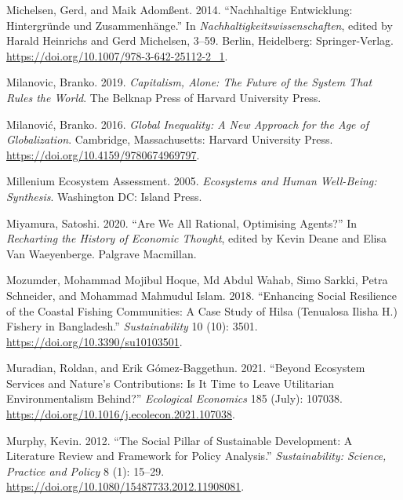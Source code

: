 \documentclass[
  a4paper,
  openany]{book}
\newlength{\cslhangindent}
\newenvironment{CSLReferences}[2] %
 {\begin{list}{}{%
  \setlength{\itemindent}{0pt}
  \setlength{\leftmargin}{0pt}
  \setlength{\parsep}{0pt}
  \ifodd #1
   \setlength{\leftmargin}{\cslhangindent}
   \setlength{\itemindent}{-1\cslhangindent}
  \fi
  \setlength{\itemsep}{#2\baselineskip}}}
 {\end{list}}
\begin{document}
\begin{CSLReferences}{1}{0}
Michelsen, Gerd, and Maik Adomßent. 2014. {``{Nachhaltige Entwicklung:
Hintergr{ü}nde und Zusammenh{ä}nge}.''} In
\emph{{Nachhaltigkeitswissenschaften}}, edited by Harald Heinrichs and
Gerd Michelsen, 3--59. Berlin, Heidelberg: Springer-Verlag.
\url{https://doi.org/10.1007/978-3-642-25112-2_1}.

Milanovic, Branko. 2019. \emph{Capitalism, {Alone}: {The Future} of the
{System} That {Rules} the {World}}. The Belknap Press of Harvard
University Press.

Milanović, Branko. 2016. \emph{Global {Inequality}: {A New Approach} for
the {Age} of {Globalization}}. Cambridge, Massachusetts: Harvard
University Press. \url{https://doi.org/10.4159/9780674969797}.

Millenium Ecosystem Assessment. 2005. \emph{Ecosystems and {Human
Well-Being}: {Synthesis}}. Washington DC: Island Press.

Miyamura, Satoshi. 2020. {``Are {We All Rational}, {Optimising
Agents}?''} In \emph{Recharting the {History} of {Economic Thought}},
edited by Kevin Deane and Elisa Van Waeyenberge. Palgrave Macmillan.

Mozumder, Mohammad Mojibul Hoque, Md Abdul Wahab, Simo Sarkki, Petra
Schneider, and Mohammad Mahmudul Islam. 2018. {``Enhancing {Social
Resilience} of the {Coastal Fishing Communities}: {A Case Study} of
{Hilsa} ({Tenualosa Ilisha H}.) {Fishery} in {Bangladesh}.''}
\emph{Sustainability} 10 (10): 3501.
\url{https://doi.org/10.3390/su10103501}.

Muradian, Roldan, and Erik Gómez-Baggethun. 2021. {``Beyond Ecosystem
Services and Nature's Contributions: {Is} It Time to Leave Utilitarian
Environmentalism Behind?''} \emph{Ecological Economics} 185 (July):
107038. \url{https://doi.org/10.1016/j.ecolecon.2021.107038}.

Murphy, Kevin. 2012. {``The Social Pillar of Sustainable Development: A
Literature Review and Framework for Policy Analysis.''}
\emph{Sustainability: Science, Practice and Policy} 8 (1): 15--29.
\url{https://doi.org/10.1080/15487733.2012.11908081}.


\end{CSLReferences}
\end{document}
